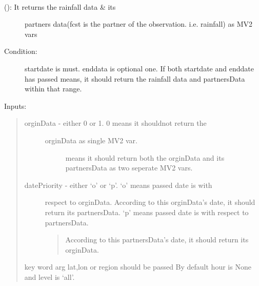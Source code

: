 \documentclass[letterpaper,10pt,english]{sphinxmanual}
\begin{document}
\begin{fulllineitems}

\begin{fulllineitems}
\label{diagnosisutils:xml_data_access.GribXmlAccess.getRainfallDataPartners}~\begin{description}
\item[{{\hyperref[diagnosisutils:xml_data_access.GribXmlAccess.getRainfallDataPartners]{}} (): It returns the rainfall data \& its}] \leavevmode
partners data(fcst is the partner of the observation.
i.e. rainfall) as MV2 vars

\item[{Condition:}] \leavevmode
startdate is must. enddata is optional one.
If both startdate and enddate has passed means, it should
return the rainfall data and partnersData within that range.

\end{description}

Inputs:
\begin{quote}
\begin{description}
\item[{orginData - either 0 or 1. 0 means it shouldnot return the}] \leavevmode\begin{description}
\item[{orginData as single MV2 var.}]  means it should return both the orginData and its
partnersData as two seperate MV2 vars.

\end{description}

\item[{datePriority - either `o' or `p'. `o' means passed date is with}] \leavevmode
respect to orginData. According to this orginData's
date, it should return its partnersData.
`p' means passed date is with respect to partnersData.
\begin{quote}

According to this partnersData's date, it should
return its orginData.
\end{quote}

\end{description}

key word arg lat,lon or region should be passed
By default hour is None and level is `all'.


\end{quote}
\end{fulllineitems}
\end{fulllineitems}
\end{document}
